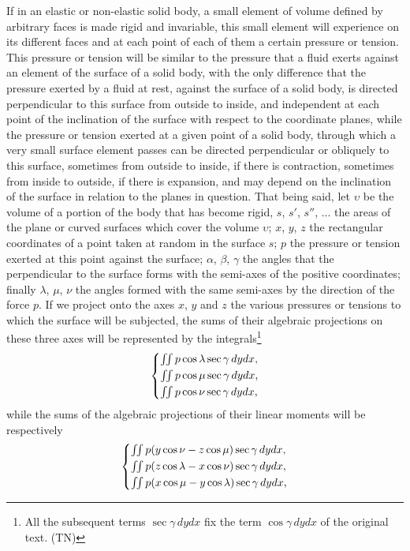 \documentclass[leqno,openright,smallroyalvopaper,8pt,twoside,showtrims]{memoir}
\begin{document}
If in an elastic or non-elastic solid body, a small element of volume defined by arbitrary faces is made rigid and invariable, this small element will experience on its different faces and at each point of each of them a certain pressure or tension. This pressure or tension will be similar to the pressure that a fluid exerts against an element of the surface of a solid body, with the only difference that the pressure exerted by a fluid at rest, against the surface of a solid body, is directed perpendicular to this surface from outside to inside, and independent at each point of the inclination of the surface with respect to the coordinate planes, while the pressure or tension exerted at a given point of a solid body, through which a very small surface element passes can be directed perpendicular or obliquely to this surface, sometimes from outside to inside, if there is contraction, sometimes from inside to outside, if there is expansion, and may depend on the inclination of the surface in relation to the planes in question. That being said, let $\upsilon$ be the volume of a portion of the body that has become rigid, $s$, $s'$, $s''$, ... the areas of the plane or curved surfaces which cover the volume $\upsilon$; $x$, $y$, $z$ the rectangular coordinates of a point taken at random in the surface $s$; $p$ the pressure or tension exerted at this point against the surface; $\alpha$, $\beta$, $\gamma$ the angles that the perpendicular to the surface forms with the semi-axes of the positive coordinates; finally $\lambda$, $\mu$, $\nu$ the angles formed with the same semi-axes by the direction of the force $p$. If we project onto the axes $x$, $y$ and $z$ the various pressures or tensions to which the surface will be subjected, the sums of their algebraic projections on these three axes will be represented by the integrals\footnote{All the subsequent terms $\sec\gamma\, dydx$ fix the term  $\cos\gamma\, dydx$ of the original text. (TN)}
 \begin{equation}\label{eq:forcas}
   \begin{dcases}
     \textstyle\iint   p\cos\lambda\sec\gamma\, dydx,\\
     \textstyle\iint   p\cos\mu\sec\gamma\, dydx,\\
     \textstyle\iint   p\cos\nu\sec\gamma\, dydx,
   \end{dcases}
 \end{equation}
while the sums of the algebraic projections of their linear moments will be respectively
 \begin{equation}
   \begin{dcases}
     \textstyle\iint   p(y\cos\nu-z\cos\mu)\sec\gamma\, dydx,\\
     \textstyle\iint   p(z\cos\lambda-x\cos\nu)\sec\gamma\, dydx,\\
     \textstyle\iint   p(x\cos\mu-y\cos\lambda)\sec\gamma\, dydx,
   \end{dcases}
 \end{equation}
\end{document}
